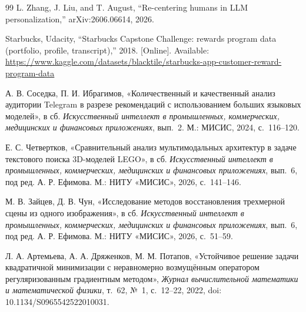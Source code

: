 \documentclass{misisarticle}
\begin{document}
\begin{thebibliography}{99}
 L. Zhang, J. Liu, and T. August, “Re-centering humans in LLM personalization,” arXiv:2606.06614, 2026.

 Starbucks, Udacity, “Starbucks Capstone Challenge: rewards program data (portfolio, profile, transcript),” 2018. [Online]. Available: \url{https://www.kaggle.com/datasets/blacktile/starbucks-app-customer-reward-program-data}

 А. В. Соседка, П. И. Ибрагимов, «Количественный и качественный анализ аудитории Telegram в разрезе рекомендаций с использованием больших языковых моделей», в сб. \textit{Искусственный интеллект в промышленных, коммерческих, медицинских и финансовых приложениях}, вып.~2. М.: МИСИС, 2024, с.~116--120.

 Е. С. Четвертков, «Сравнительный анализ мультимодальных архитектур в задаче текстового поиска 3D-моделей LEGO», в сб. \textit{Искусственный интеллект в промышленных, коммерческих, медицинских и финансовых приложениях}, вып.~6, под ред. А. Р. Ефимова. М.: НИТУ «МИСИС», 2026, с.~141--146.

 М. В. Зайцев, Д. В. Чун, «Исследование методов восстановления трехмерной сцены из одного изображения», в сб. \textit{Искусственный интеллект в промышленных, коммерческих, медицинских и финансовых приложениях}, вып.~6, под ред. А. Р. Ефимова. М.: НИТУ «МИСИС», 2026, с.~51--59.

 Л. А. Артемьева, А. А. Дряженков, М. М. Потапов, «Устойчивое решение задачи квадратичной минимизации с неравномерно возмущённым оператором регуляризованным градиентным методом», \textit{Журнал вычислительной математики и математической физики}, т.~62, №~1, с.~12--22, 2022, doi: 10.1134/S0965542522010031.

\end{thebibliography}
\end{document}
